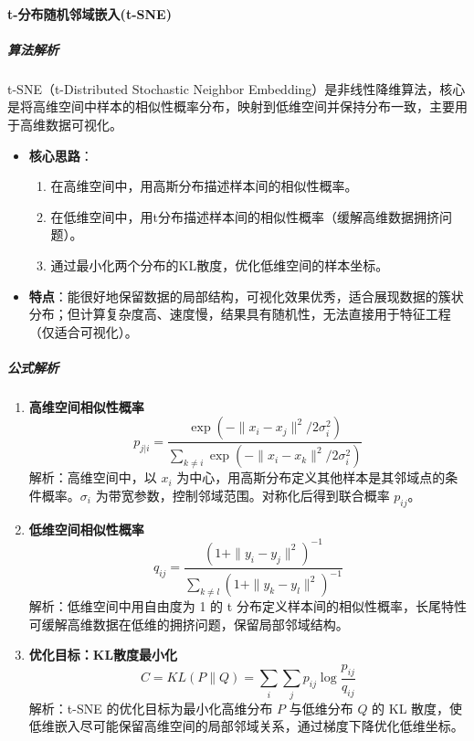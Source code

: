 \documentclass[12pt]{article}
\begin{document}
\paragraph{t-分布随机邻域嵌入(t-SNE)}
\subparagraph{算法解析}
t-SNE（t-Distributed Stochastic Neighbor Embedding）是非线性降维算法，核心是将高维空间中样本的相似性概率分布，映射到低维空间并保持分布一致，主要用于高维数据可视化。
\begin{itemize}
    \item \textbf{核心思路}：
    \begin{enumerate}
        \item 在高维空间中，用高斯分布描述样本间的相似性概率。
        \item 在低维空间中，用t分布描述样本间的相似性概率（缓解高维数据拥挤问题）。
        \item 通过最小化两个分布的KL散度，优化低维空间的样本坐标。
    \end{enumerate}
    \item \textbf{特点}：能很好地保留数据的局部结构，可视化效果优秀，适合展现数据的簇状分布；但计算复杂度高、速度慢，结果具有随机性，无法直接用于特征工程（仅适合可视化）。
\end{itemize}

\subparagraph{公式解析}
\begin{enumerate}
    \item \textbf{高维空间相似性概率}
    \[
    p_{j|i} = \frac{\exp\left( -\|x_i - x_j\|^2 / 2\sigma_i^2 \right)}{\sum_{k \neq i} \exp\left( -\|x_i - x_k\|^2 / 2\sigma_i^2 \right)}
    \]
    解析：高维空间中，以 $x_i$ 为中心，用高斯分布定义其他样本是其邻域点的条件概率。$\sigma_i$ 为带宽参数，控制邻域范围。对称化后得到联合概率 $p_{ij}$。

    \item \textbf{低维空间相似性概率}
    \[
    q_{ij} = \frac{\left( 1 + \|y_i - y_j\|^2 \right)^{-1}}{\sum_{k \neq l} \left( 1 + \|y_k - y_l\|^2 \right)^{-1}}
    \]
    解析：低维空间中用自由度为 1 的 t 分布定义样本间的相似性概率，长尾特性可缓解高维数据在低维的拥挤问题，保留局部邻域结构。

    \item \textbf{优化目标：KL散度最小化}
    \[
    C = KL(P \parallel Q) = \sum_i \sum_j p_{ij} \log \frac{p_{ij}}{q_{ij}}
    \]
    解析：t-SNE 的优化目标为最小化高维分布 $P$ 与低维分布 $Q$ 的 KL 散度，使低维嵌入尽可能保留高维空间的局部邻域关系，通过梯度下降优化低维坐标。
\end{enumerate}
\end{document}
